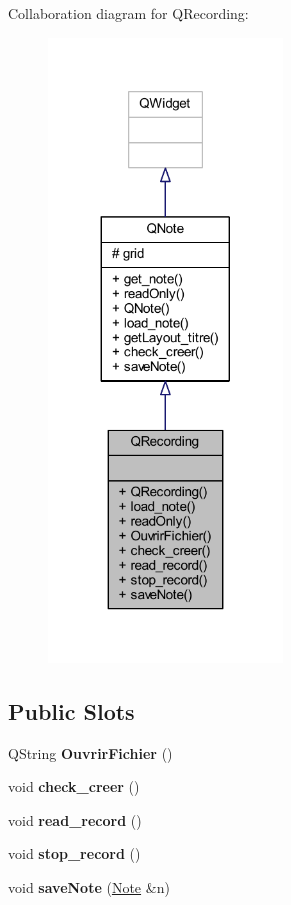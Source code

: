 Collaboration diagram for Q\+Recording\+:
\nopagebreak
\begin{figure}[H]
\begin{center}
\leavevmode
\includegraphics[width=176pt]{class_q_recording__coll__graph}
\end{center}
\end{figure}
\subsection*{Public Slots}
\begin{DoxyCompactItemize}
\item 
\mbox{\label{class_q_recording_a9eaf976da6c3c768d15a5e53f3982753}} 
Q\+String {\bfseries Ouvrir\+Fichier} ()
\item 
\mbox{\label{class_q_recording_ad889ab95e55e1ce9ebff8726aa916fe2}} 
void {\bfseries check\+\_\+creer} ()
\item 
\mbox{\label{class_q_recording_a5c5c221fed1648c1813da1f195e26663}} 
void {\bfseries read\+\_\+record} ()
\item 
\mbox{\label{class_q_recording_a35476e910a18814b7beb0e73819279d8}} 
void {\bfseries stop\+\_\+record} ()
\item 
\mbox{\label{class_q_recording_a37492f3dbda2dad2a8cd62012fe91b78}} 
void {\bfseries save\+Note} (\hyperlink{class_note}{Note} \&n)
\end{DoxyCompactItemize}
